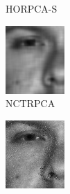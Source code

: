 \begin{figure}
\begin{subfigure}[b]{.19\linewidth}
    \caption{HORPCA-S}
\end{subfigure}\hfill
\begin{subfigure}[b]{.19\linewidth}
    \includegraphics[width = \linewidth]{DN_yale/yale_03_1_nctrpca_fsim} 
    \caption{NCTRPCA}
\end{subfigure}\hfill
\begin{subfigure}[b]{.19\linewidth}
    \includegraphics[width = \linewidth]{DN_yale/yale_03_1_rnndl_fsim} 

\end{subfigure}
\end{figure}
